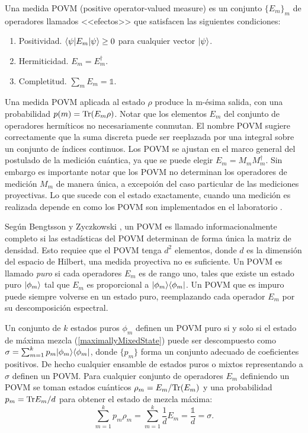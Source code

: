 \begin{definition} Una medida POVM (positive operator-valued measure) es un conjunto $\{E_{m}\} _{m}$ de operadores llamados <<efectos>> que satisfacen las siguientes condiciones:
	\begin{enumerate}
		\item Positividad. $\langle \psi |E_m|\psi \rangle \ge 0 $ para cualquier vector $|\psi\rangle$.
		\item Hermiticidad. $E_m=E_{m}^\dagger$.
		\item  Completitud. $\sum_m E_m =\mathds{1}$.
	\end{enumerate}
\end{definition}

Una medida POVM aplicada al estado $\rho$ produce la m-ésima salida, con una probabilidad $p(m)={\rm Tr}(E_m \rho)$. Notar que los elementos $E_m$ del conjunto de operadores hermíticos no necesariamente conmutan. El nombre POVM sugiere correctamente que la suma discreta puede ser reeplazada por una integral sobre un conjunto de índices continuos. Los POVM se ajustan en el marco general del postulado de la medición cuántica, ya que se puede elegir $E_m=M_m M_m^{\dagger}$. Sin embargo es importante notar que los POVM no determinan los operadores de medición $M_m$ de manera única, a excepoión del caso particular de las mediciones proyectivas. Lo que sucede con el estado exactamente, cuando una medición es realizada depende en como los POVM son implementados en el laboratorio {\cite{2007geometry}}.   

Según Bengtsson y Zyczkowski {\cite{2007geometry}}, un POVM es llamado informacionalmente completo si las estadísticas del POVM determinan de forma única la matriz de densidad. Esto requiee que el POVM tenga $d^2$ elementos, donde $d$ es la dimensión del espacio de Hilbert, una medida proyectiva no es suficiente. Un POVM es llamado \textit{puro} si cada operadores $E_m$ es de rango uno, tales que existe un estado puro $|\phi_m\rangle$ tal que $E_m$ es proporcional a $|\phi_m\rangle \langle\phi_m|$. Un POVM que es impuro puede siempre volverse en un estado puro, reemplazando cada operador $E_m$ por su descomposición espectral. 

Un conjunto de $k$ estados puros $\phi_m$ definen un POVM puro si y solo si el estado de máxima  mezcla (\ref{maximallyMixedState}) puede ser descompuesto como  $\sigma=\sum_{m=1}^{k}p_m|\phi_m\rangle \langle\phi_m|$, donde $\{p_m\}$ forma un conjunto adecuado de coeficientes positivos. De hecho cualquier ensamble de estados puros o mixtos representando a $\sigma$ definen un POVM\@. Para cualquier conjunto de operadores $E_m$ definiendo un POVM se toman estados cuánticos $\rho_m=E_m/{\rm Tr}(E_m)$ y una probabilidad $p_m={\rm Tr} E_m/d$ para obtener el estado de mezcla máxima: \begin{equation}
	\sum_{m=1}^{k} p_m\rho _{m}=\sum_{m=1}^k \dfrac{1}{d}E_m=\dfrac{\mathds{1}}{d}=\sigma.
\end{equation}

